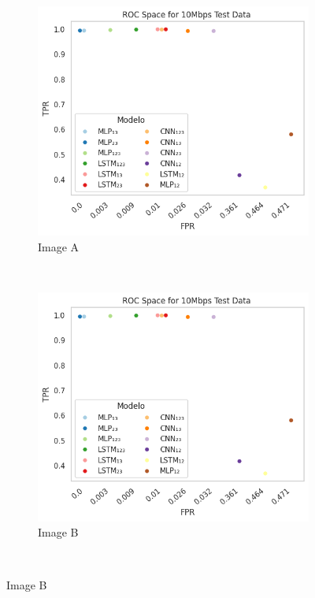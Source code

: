 \documentclass[a4paper,fleqn]{cas-sc}
\begin{document}
\begin{figure}
\begin{minipage}[t]{0.46\textwidth}
\begin{subfigure}[t]{0.33\textwidth}
				\includegraphics[draft=false, width=\textwidth]{./figs/ROC-Space-Test-Data-10Mbps.png} 
				\caption{Image A}
				\label{fig:1a}
			\end{subfigure}%
			~
			\begin{subfigure}[t]{0.33\textwidth}
				\includegraphics[draft=false, width=\textwidth]{./figs/ROC-Space-Test-Data-10Mbps.png} 
				\caption{Image B}
				\label{fig:2a}
			\end{subfigure}%
			~

\end{minipage}
\end{figure}
\end{document}
